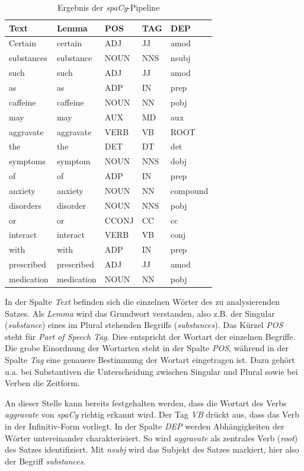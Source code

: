 \begin{table}
\centering
\begin{tabular}{lllll}
\hline
\textbf{Text}	& \textbf{Lemma}	& \textbf{POS} & \textbf{TAG} & \textbf{DEP} \\
\hline
Certain & certain & ADJ & JJ & amod \\
substances & substance & NOUN & NNS & nsubj \\
such & such & ADJ & JJ & amod \\
as & as & ADP & IN & prep \\
caffeine & caffeine & NOUN & NN & pobj \\
may & may & AUX & MD & aux \\
aggravate & aggravate & VERB & VB & ROOT \\
the & the & DET & DT & det \\
symptoms & symptom & NOUN & NNS & dobj \\
of & of & ADP & IN & prep \\
anxiety & anxiety & NOUN & NN & compound \\
disorders & disorder & NOUN & NNS & pobj \\
or & or & CCONJ & CC & cc \\
interact & interact & VERB & VB & conj \\
with & with & ADP & IN & prep \\
prescribed & prescribed & ADJ & JJ & amod \\
medication & medication & NOUN & NN & pobj \\
\hline
\end{tabular}
\caption{Ergebnis der \emph{spaCy}-Pipeline}
\label{tab:spaCy}
\end{table}

In der Spalte \emph{Text} befinden sich die einzelnen Wörter des zu analysierenden Satzes. Als \emph{Lemma} wird das Grundwort verstanden, also z.B. der Singular (\emph{substance}) eines im Plural stehenden Begriffs (\emph{substances}). 
Das Kürzel \emph{POS} steht für \emph{Part of Speech Tag}. Dies entspricht der Wortart der einzelnen Begriffe. Die grobe Einordnung der Wortarten steht in der Spalte \emph{POS}, während in der Spalte \emph{Tag} eine genauere Bestimmung der Wortart eingetragen ist. Dazu gehört u.a. bei Substantiven die Unterscheidung zwischen Singular und Plural sowie bei Verben die Zeitform.

An dieser Stelle kann bereits festgehalten werden, dass die Wortart des Verbs \emph{aggravate} von \emph{spaCy} richtig erkannt wird. Der Tag \emph{VB} drückt aus, dass das Verb in der Infinitiv-Form vorliegt. In der Spalte \emph{DEP} werden Abhängigkeiten der Wörter untereinander charakterisiert. So wird \emph{aggravate} als zentrales Verb (\emph{root}) des Satzes identifiziert. Mit \emph{nsubj} wird das Subjekt des Satzes markiert, hier also der Begriff \emph{substances}.

